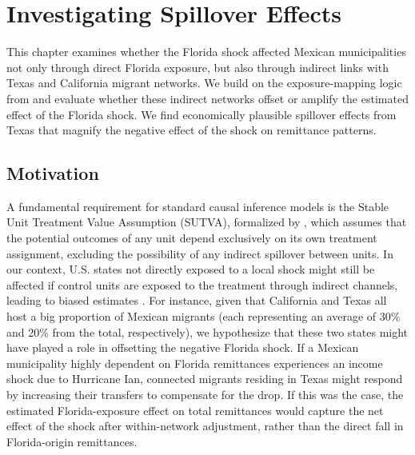 \chapter{Investigating Spillover Effects} \label{chap:spillovers}
This chapter examines whether the Florida shock affected Mexican municipalities not only through direct Florida exposure, but also through indirect links with Texas and California migrant networks. We build on the exposure-mapping logic from \textcite{aronow2017} and evaluate whether these indirect networks offset or amplify the estimated effect of the Florida shock. We find economically plausible spillover effects from Texas that magnify the negative effect of the shock on remittance patterns.
\section{Motivation}
A fundamental requirement for standard causal inference models is the Stable Unit Treatment Value Assumption (SUTVA), formalized by \textcite{rubin1980}, which assumes that the potential outcomes of any unit depend exclusively on its own treatment assignment, excluding the possibility of any indirect spillover between units. In our context, U.S. states not directly exposed to a local shock might still be affected if control units are exposed to the treatment through indirect channels, leading to biased estimates \parencite{clarke2017, aronow2017}. For instance, given that California and Texas all host a big proportion of Mexican migrants (each representing an average of 30\% and 20\% from the total, respectively), we hypothesize that these two states might have played a role in offsetting the negative Florida shock. If a Mexican municipality highly dependent on Florida remittances experiences an income shock due to Hurricane Ian, connected migrants residing in Texas might respond by increasing their transfers to compensate for the drop. If this was the case, the estimated Florida-exposure effect on total remittances would capture the net effect of the shock after within-network adjustment, rather than the direct fall in Florida-origin remittances. 

